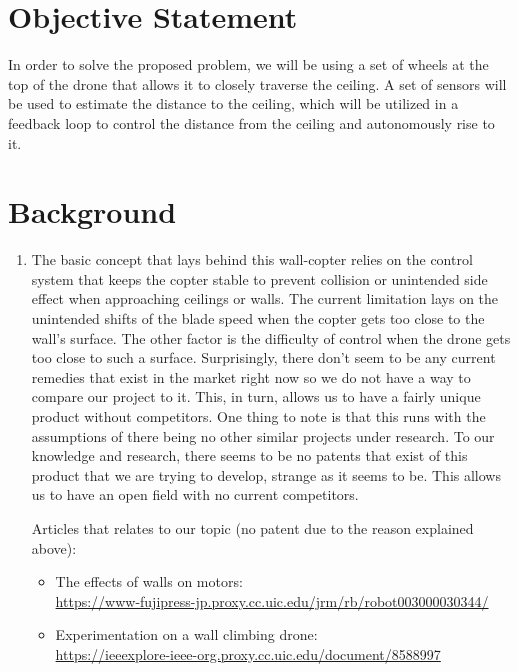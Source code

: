 \documentclass[12pt]{article}
\begin{document}
    \section{Objective Statement}
        In order to solve the proposed problem, we will be using a set of wheels at the top of the drone that allows it to closely traverse the ceiling. A set of sensors will be used to estimate the distance to the ceiling, which will be utilized in a feedback loop to control the distance from the ceiling and autonomously rise to it.

    \newpage
    \section{Background}
        \begin{enumerate}[label=\Alph*.]
            \item The basic concept that lays behind this wall-copter relies on the control system that keeps the copter stable to prevent collision or unintended side effect when approaching ceilings or walls. The current limitation lays on the unintended shifts of the blade speed when the copter gets too close to the wall's surface. The other factor is the difficulty of control when the drone gets too close to such a surface. Surprisingly, there don't seem to be any current remedies that exist in the market right now so we do not have a way to compare our project to it. This, in turn, allows us to have a fairly unique product without competitors. One thing to note is that this runs with the assumptions of there being no other similar projects under research. To our knowledge and research, there seems to be no patents that exist of this product that we are trying to develop, strange as it seems to be. This allows us to have an open field with no current competitors.
            
            Articles that relates to our topic (no patent due to the reason explained above): 
            \begin{itemize}[label=]
                \item The effects of walls on motors:\\\url{https://www-fujipress-jp.proxy.cc.uic.edu/jrm/rb/robot003000030344/}
                \item Experimentation on a wall climbing drone:\\\url{https://ieeexplore-ieee-org.proxy.cc.uic.edu/document/8588997}
            \end{itemize}


\end{enumerate}
\end{document}
